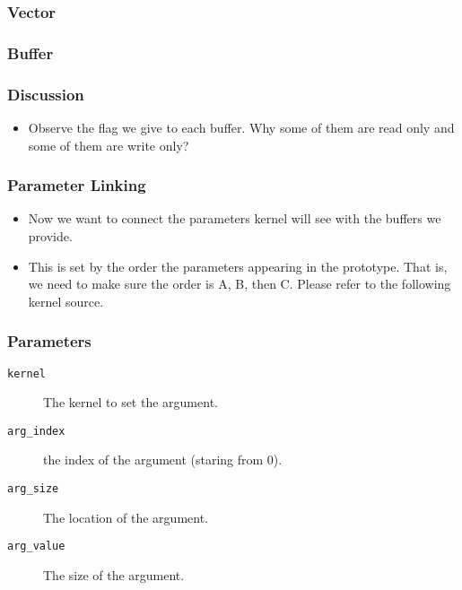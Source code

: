 \documentclass{beamer}
\begin{document}
\begin{frame}
  \frametitle{Vector}
\end{frame}


\begin{frame}
  \frametitle{Buffer}
  \centerline{}
\end{frame}

\begin{frame}
  \frametitle{Discussion}
  \begin{itemize}
    \item Observe the flag we give to each buffer.  Why some of them
      are read only and some of them are write only?
  \end{itemize}
\end{frame}


\begin{frame}
  \frametitle{Parameter Linking}
  \begin{itemize}
  \item Now we want to connect the parameters kernel will see with the
    buffers we provide.
  \item This is set by the order the parameters appearing in the
    prototype.  That is, we need to make sure the order is A, B, then
    C.  Please refer to the following kernel source.
  \end{itemize}
\end{frame}

\begin{frame}
\end{frame}

\begin{frame}
\end{frame}

\begin{frame}
  \frametitle{Parameters}
  \begin{description}
  \item [\tt kernel] The kernel to set the argument.
  \item [\tt arg\_index] the index of the argument (staring from 0).
  \item [\tt arg\_size] The location of the argument.
  \item [\tt arg\_value] The size of the argument.
  \end{description}
\end{frame}
\end{document}
